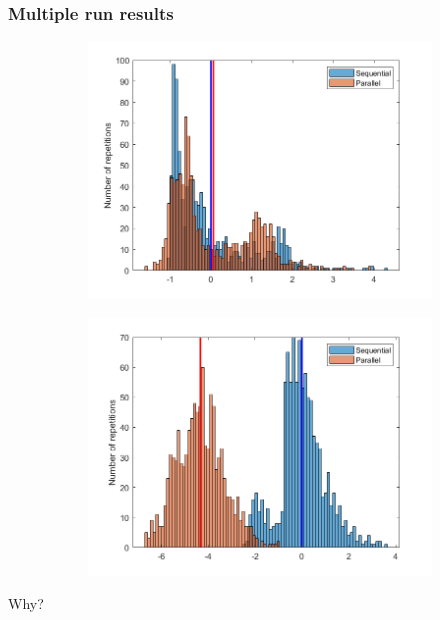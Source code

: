 \documentclass{beamer}
\begin{document}
\begin{frame} %
	\frametitle{Multiple run results}
	\begin{figure}
		\begin{subfigure}{.5\textwidth}
			\includegraphics[width=\linewidth]{etc/test5_3.jpeg}
		\end{subfigure}%
		\begin{subfigure}{.5\textwidth}
			\includegraphics[width=\linewidth]{etc/test6_3.jpeg}
		\end{subfigure}
	\end{figure}
	\begin{center}
		\vspace{16pt}
		Why?
	\end{center}
\end{frame}
\end{document}
